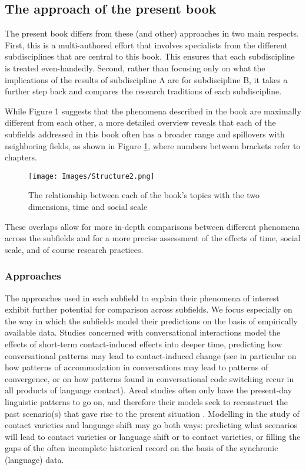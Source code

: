 \subsection{The approach of the present book} \label{framework}

The present book differs from these (and other) approaches in two main respects. First, this is a multi-authored effort that involves specialists from the different subdisciplines that are central to this book. This ensures that each subdiscipline is treated even-handedly. Second, rather than focusing only on what the implications of the results of subdiscipline A are for subdiscipline B, it takes a further step back and compares the research traditions of each subdiscipline. 

While Figure 1 suggests that the phenomena described in the book are maximally different from each other, a more detailed overview reveals that each of the subfields addressed in this book often has a broader range and spillovers with neighboring fields, as shown in Figure \ref{fig-structure2}, where numbers between brackets refer to chapters.

\begin{figure}[h]
\caption{The relationship between each of the book's topics with the two dimensions, time and social scale} \label{fig-structure2}
\centering
\texttt{[image: Images/Structure2.png]}
\end{figure}

These overlaps allow for more in-depth comparisons between different phenomena across the subfields and for a more precise assessment of the effects of time, social scale, and of course research practices.

\subsubsection*{Approaches}
The approaches used in each subfield to explain their phenomena of interest exhibit further potential for comparison across subfields. We focus especially on the way in which the subfields model their predictions on the basis of empirically available data. Studies concerned with conversational interactions model the effects of short-term contact-induced effects into deeper time, predicting how conversational patterns may lead to contact-induced change (see in particular \cite{niedzielskietal1996linguistic} on how patterns of accommodation in conversations may lead to patterns of convergence, or \cite{myers2008language} on how patterns found in conversational code switching recur in all products of language contact). Areal studies often only have the present-day linguistic patterns to go on, and therefore their models seek to reconstruct the past scenario(s) that gave rise to the present situation \parencite[see e.g.][]{muysken2010scenarios, Nichols2003Diversity}. Modelling in the study of contact varieties and language shift may go both ways: predicting what scenarios will lead to contact varieties or language shift or to contact varieties, or filling the gaps of the often incomplete historical record on the basis of the synchronic (language) data.

